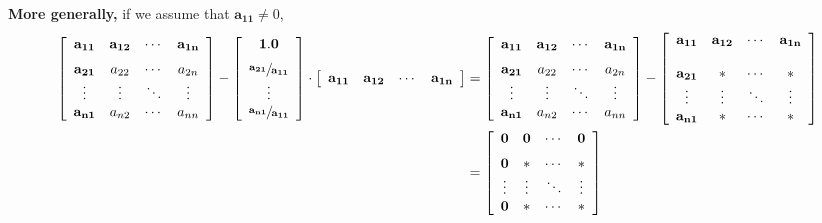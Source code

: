     
\textbf{More generally,} if we assume that $\mathbf{a_{11}} \neq 0$,
\begin{align*}
     \left[\begin{array}{cccc} \mathbf{a_{11}}& \mathbf{a_{12} }& \cdots & \mathbf{a_{1n}} \medskip \\
\mathbf{ a_{21} }& a_{22}& \cdots & a_{2n}  \\
 \vdots & \vdots&  \ddots & \vdots \\
 \mathbf{a_{n1} }& a_{n2}& \cdots & a_{nn} 
 \end{array}\right]- \left[\begin{array}{c} \mathbf{1.0} \medskip \\
\mathbf{\sfrac{a_{21}}{a_{11}}} \\
 \vdots \\
 \mathbf{\sfrac{a_{n1}}{a_{11}} }
 \end{array}\right] \cdot \left[\begin{array}{cccc} \mathbf{a_{11}} & \mathbf{a_{12}} & \cdots & \mathbf{a_{1n} }
 \end{array}\right]&= \left[\begin{array}{cccc} \mathbf{a_{11}}& \mathbf{a_{12} }& \cdots & \mathbf{a_{1n}} \medskip \\
\mathbf{ a_{21} }& a_{22}& \cdots & a_{2n}  \\
 \vdots & \vdots&  \ddots & \vdots \\
 \mathbf{a_{n1} }& a_{n2}& \cdots & a_{nn} 
 \end{array}\right] - \left[\begin{array}{cccc} \mathbf{a_{11}} & \mathbf{a_{12} } & \cdots & \mathbf{a_{1n}} \\
 &\\
 \mathbf{a_{21} }& \ast & \cdots & \ast \\
 \vdots & \vdots&  \ddots & \vdots \\
 \mathbf{a_{n1} }& \ast& \cdots & \ast 
 \end{array}\right]  \bigskip \\
 &= \left[\begin{array}{cccc} \mathbf{0} & \mathbf{0} & \cdots & \mathbf{0} \medskip \\
\mathbf{0} & \ast & \cdots & \ast \\
 \vdots & \vdots&  \ddots & \vdots \\
\mathbf{0} & \ast& \cdots & \ast 
 \end{array}\right]
 \end{align*}
    
